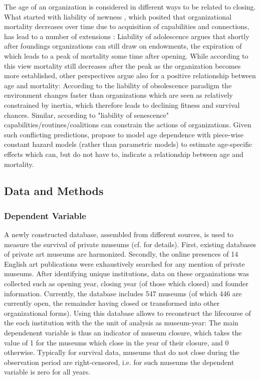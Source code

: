 \documentclass[12pt]{article}
\begin{document}
The age of an organization is considered in different ways to be related to closing.
What started with liability of newness \parencite{Stinchcombe_1965_structure}, which posited that organizational mortality decreases over time due to acquisition of capabilities and connections, has lead to a number of extensions \parencite{Carroll_Khessina_2019_demography,Hannan_1998_mortality}:
Liability of adolescence argues that shortly after foundings organizations can still draw on endowments, the expiration of which leads to a peak of mortality some time after opening.
While according to this view mortality still decreases after the peak as the organization becomes more established, other perspectives argue also for a positive relationship between age and mortality:
According to the liability of obsolescence paradigm the environment changes faster than organizations which are seen as relatively constrained by inertia, which therefore leads to declining fitness and survival chances.
Similar, according to "liability of senescence" capabilities/routines/coalitions can constrain the actions of organizations.
Given such conflicting predictions, \textcite{Carroll_Khessina_2019_demography} propose to model age dependence with piece-wise constant hazard models (rather than parametric models) to estimate age-specific effects which can, but do not have to, indicate a relationship between age and mortality.




\subsection*{Data and Methods}
\label{sec:org6923afe}

\subsubsection*{Dependent Variable}
\label{sec:org7efae3c}
A newly constructed database, assembled from different sources,  is used to measure the survival of private museums (cf. \textcite{Velthuis_etal_2023_boom} for details).
First, existing databases of private art museums are harmonized.
Secondly, the online presences of 14 English art publications were exhaustively searched for any mention of private museums.
After identifying unique institutions, data on these organizations was collected such as opening year, closing year (of those which closed) and founder information.
Currently, the database includes 547 museums (of which 446 are currently open, the remainder having closed or transformed into other organizational forms).
Using this database allows to reconstruct the lifecourse of the each institution with the the unit of analysis as museum-year:
The main dependenent variable is thus an indicator of museum closure, which takes the value of 1 for the museums which close in the year of their closure, and 0 otherwise.
Typically for survival data, museums that do not close during the observation period are right-censored, i.e. for such museums the dependent variable is zero for all years.
\end{document}
